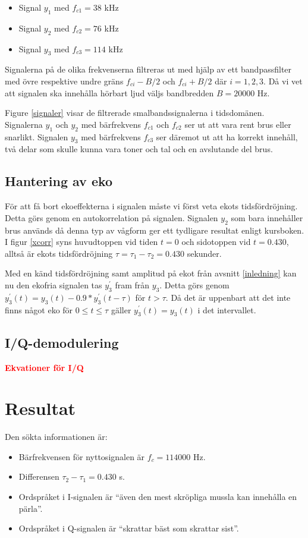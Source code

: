 \documentclass[10pt]{article}
\newcommand{\todo}[1]{\textbf{\textcolor{red}{#1}}}
\begin{document}
\begin{multicols}{2}
\begin{itemize}
\item Signal $y_1$ med $f_{c1}=38$ kHz
\item Signal $y_2$ med $f_{c2}=76$ kHz
\item Signal $y_3$ med $f_{c3}=114$ kHz
\end{itemize}

Signalerna på de olika frekvenserna filtreras ut med hjälp av ett bandpassfilter med övre respektive undre gräns $f_{ci} - B/2$ och $f_{ci} + B/2$ där $i = 1,2,3$. Då vi vet att signalen ska innehålla hörbart ljud väljs bandbredden $B=20000$ Hz.


Figure \ref{signaler} visar de filtrerade smalbandssignalerna i tidsdomänen. Signalerna $y_1$ och $y_2$ med bärfrekvens $f_{c1}$ och $f_{c2}$ ser ut att vara rent brus eller snarlikt. Signalen $y_3$ med bärfrekvens $f_{c3}$ ser däremot ut att ha korrekt innehåll, två delar som skulle kunna vara toner och tal och en avslutande del brus.

\subsection{Hantering av eko}
För att få bort ekoeffekterna i signalen måste vi först veta ekots tidsfördröjning. Detta görs genom en autokorrelation på signalen. Signalen $y_2$ som bara innehåller brus används då denna typ av vågform ger ett tydligare resultat enligt kursboken. I figur \ref{xcorr} syns huvudtoppen vid tiden $t = 0$ och sidotoppen vid $t = 0.430$, alltså är ekots tidsfördröjning $\tau = \tau_{1} - \tau_{2} = 0.430$ sekunder.

Med en känd tidsfördröjning samt amplitud på ekot från avsnitt \ref{inledning} kan nu den ekofria signalen tas $y_{3}^{'}$ fram från $y_3$. Detta görs genom $y_{3}^{'}(t) = y_{3}(t) - 0.9*y_{3}^{'}(t - \tau)$ för $t > \tau$. Då det är uppenbart att det inte finns något eko för $0 \leq t \leq \tau$ gäller $y_{3}^{'}(t) = y_{3}(t)$ i det intervallet.

\subsection{I/Q-demodulering}
\todo{Ekvationer för I/Q} \\

\section{Resultat}

Den sökta informationen är:

\begin{itemize}
\item Bärfrekvensen för nyttosignalen är $f_c = 114000$ Hz.
\item Differensen $\tau_{2} - \tau_{1} = 0.430$ s.
\item Ordspråket i I-signalen är ``även den mest skröpliga mussla kan innehålla en pärla''.
\item Ordspråket i Q-signalen är ``skrattar bäst som skrattar sist''.
\end{itemize}
\end{multicols}
\end{document}
